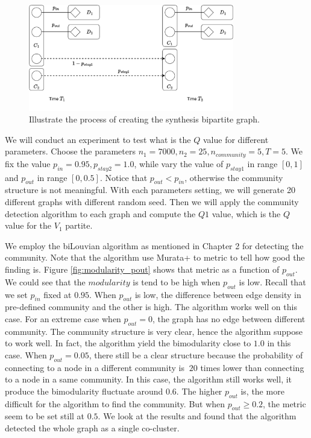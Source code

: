 \begin{figure}[H]
	\centering
	\includegraphics[width=0.8\textwidth]{images/synthesis.pdf}
	\caption{Illustrate the process of creating the synthesis bipartite graph.}
	\label{fig:synthesis_graph}
\end{figure}

We will conduct an experiment to test what is the $Q$ value for different parameters.
Choose the parameters $n_1 = 7000, n_2 = 25, n_{community} = 5, T=5$.
We fix the value $p_{in} = 0.95, p_{stay2} = 1.0$, while vary the value of $p_{stay1}$ in range $[0, 1]$ and $p_{out}$ in range $[0, 0.5]$.
Notice that $p_{out} < p_{in}$, otherwise the community structure is not meaningful.
With each parameters setting, we will generate 20 different graphs with different random seed.
Then we will apply the community detection algorithm to each graph and compute the $Q1$ value,
which is the $Q$ value for the $V_1$ partite.

We employ the biLouvian algorithm as mentioned in Chapter 2 for detecting the community.
Note that the algorithm use Murata+ to metric to tell how good the finding is.
Figure \ref{fig:modularity_pout} shows that metric as a function of $p_{out}$.
We could see that the $modularity$ is tend to be high when $p_{out}$ is low.
Recall that we set $p_{in}$ fixed at $0.95$.
When $p_{out}$ is low, the difference between edge density in pre-defined community and the other is high.
The algorithm works well on this case.
For an extreme case when $p_{out} = 0$, the graph has no edge between different community.
The community structure is very clear, hence the algorithm suppose to work well.
In fact, the algorithm yield the bimodularity close to $1.0$ in this case.
When $p_{out} = 0.05$, there still be a clear structure because the probability
of connecting to a node in a different community is $~20$ times lower than
connecting to a node in a same community.
In this case, the algorithm still works well, it produce the bimodularity fluctuate around $0.6$.
The higher $p_{out}$ is, the more difficult for the algorithm to find the community.
But when $p_{out} \ge 0.2$, the metric seem to be set still at $0.5$.
We look at the results and found that the algorithm detected the whole graph as a single co-cluster.


